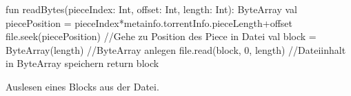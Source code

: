 \begin{program}
    \begin{GenericCode}[numbers=none]
fun readBytes(pieceIndex: Int, offset: Int, length: Int): ByteArray {
    val piecePosition = pieceIndex*metainfo.torrentInfo.pieceLength+offset
    file.seek(piecePosition)      //Gehe zu Position des Piece in Datei
    val block = ByteArray(length) //ByteArray anlegen 
    file.read(block, 0, length)   //Dateiinhalt in ByteArray speichern
    return block
}
\end{GenericCode}
\caption{Auslesen eines Blocks aus der Datei.}
\label{prog:FileRead}
\end{program}